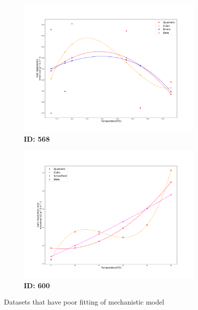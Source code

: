\documentclass[11pt]{article}
\begin{document}
\begin{figure}
    \begin{subfigure}[t]{.5\textwidth}
      \center
      \includegraphics[width=\linewidth]{images/TPC_fitting568.pdf}
      \caption{\textbf{ID: 568}}
    \end{subfigure}
    \hfill
    \begin{subfigure}[t]{.5\textwidth}
    \center
      \includegraphics[width=\linewidth]{images/TPC_fitting600.pdf}
      \caption{\textbf{ID: 600}}
    \end{subfigure}
    \caption{Datasets that have poor fitting of mechanistic model}
  \end{figure}
\end{document}
